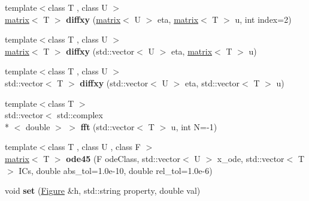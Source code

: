 \begin{DoxyCompactItemize}
\item 
\hypertarget{namespacekeycpp_a379324b1d1cb219fdde96c9678aa5341}{{\footnotesize template$<$class T , class U $>$ }\\\hyperlink{classkeycpp_1_1matrix}{matrix}$<$ T $>$ {\bfseries diffxy} (\hyperlink{classkeycpp_1_1matrix}{matrix}$<$ U $>$ eta, \hyperlink{classkeycpp_1_1matrix}{matrix}$<$ T $>$ u, int index=2)}\label{namespacekeycpp_a379324b1d1cb219fdde96c9678aa5341}

\item 
\hypertarget{namespacekeycpp_a5b09f118fe12b83865ff08fe3d3633ff}{{\footnotesize template$<$class T , class U $>$ }\\\hyperlink{classkeycpp_1_1matrix}{matrix}$<$ T $>$ {\bfseries diffxy} (std\-::vector$<$ U $>$ eta, \hyperlink{classkeycpp_1_1matrix}{matrix}$<$ T $>$ u)}\label{namespacekeycpp_a5b09f118fe12b83865ff08fe3d3633ff}

\item 
\hypertarget{namespacekeycpp_a3bdbcb862d76b1b1fb5157788b7336ae}{{\footnotesize template$<$class T , class U $>$ }\\std\-::vector$<$ T $>$ {\bfseries diffxy} (std\-::vector$<$ U $>$ eta, std\-::vector$<$ T $>$ u)}\label{namespacekeycpp_a3bdbcb862d76b1b1fb5157788b7336ae}

\item 
\hypertarget{namespacekeycpp_a6b17b3d224192fffc838834ff736d572}{{\footnotesize template$<$class T $>$ }\\std\-::vector$<$ std\-::complex\\*
$<$ double $>$ $>$ {\bfseries fft} (std\-::vector$<$ T $>$ u, int N=-\/1)}\label{namespacekeycpp_a6b17b3d224192fffc838834ff736d572}

\item 
\hypertarget{namespacekeycpp_a880f7df231a78f912b3fb5d301c809f9}{{\footnotesize template$<$class T , class U , class F $>$ }\\\hyperlink{classkeycpp_1_1matrix}{matrix}$<$ T $>$ {\bfseries ode45} (F ode\-Class, std\-::vector$<$ U $>$ x\-\_\-ode, std\-::vector$<$ T $>$ I\-Cs, double abs\-\_\-tol=1.\-0e-\/10, double rel\-\_\-tol=1.\-0e-\/6)}\label{namespacekeycpp_a880f7df231a78f912b3fb5d301c809f9}

\item 
\hypertarget{namespacekeycpp_afcd6ae07fc18f5374868fe314f00108c}{void {\bfseries set} (\hyperlink{classkeycpp_1_1_figure}{Figure} \&h, std\-::string property, double val)}\label{namespacekeycpp_afcd6ae07fc18f5374868fe314f00108c}


\end{DoxyCompactItemize}
